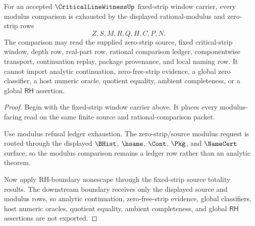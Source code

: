 \begin{theorem}
\label{thm:critical-line-witness-fixed-strip-modulus-ledger}
For an accepted $\CriticalLineWitnessUp$ fixed-strip window carrier, every modulus comparison is exhausted by the displayed rational-modulus and zero-strip rows
$$
Z,S,M,R,Q,H,C,P,N.
$$
The comparison may read the supplied zero-strip source, fixed critical-strip window, depth row, real-part row, rational comparison ledger, componentwise transport, continuation replay, package provenance, and local naming row. It cannot import analytic continuation, zero-free-strip evidence, a global zero classifier, a host numeric oracle, quotient equality, ambient completeness, or a global $\mathsf{RH}$ assertion.
\end{theorem}
\begin{proof}
Begin with the fixed-strip window carrier above. It places every modulus-facing read on the same finite source and rational-comparison packet.

Use modulus refusal ledger exhaustion. The zero-strip/source modulus request is routed through the displayed $\BHist$, $\hsame$, $\Cont$, $\Pkg$, and $\NameCert$ surface, so the modulus comparison remains a ledger row rather than an analytic theorem.

Now apply RH-boundary nonescape through the fixed-strip source totality results. The downstream boundary receives only the displayed source and modulus rows, so analytic continuation, zero-free-strip evidence, global classifiers, host numeric oracles, quotient equality, ambient completeness, and global $\mathsf{RH}$ assertions are not exported.
\end{proof}

